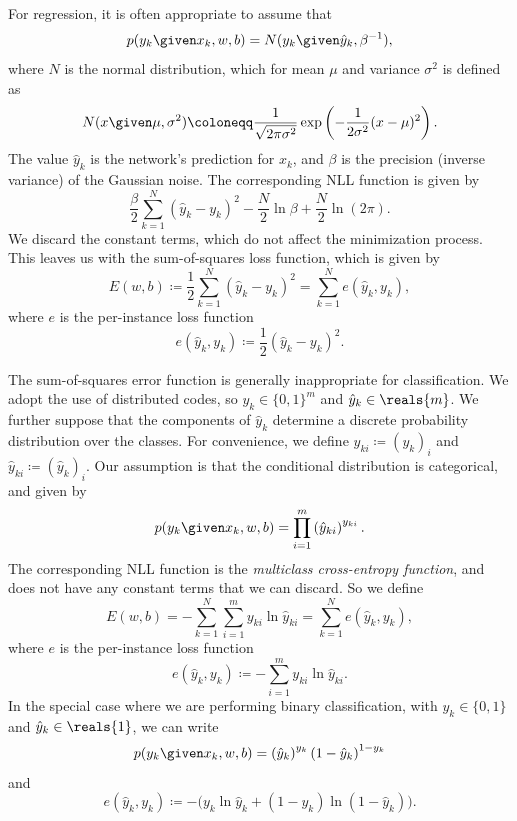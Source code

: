 \documentclass[11pt,a4paper]{article}
\numberwithin{equation}{section}
\begin{document}
For regression, it is often appropriate to assume that
\[
	p(y_k \given x_k, w, b) = N(y_k \given \hat{y}_k, \beta^{-1}),
\]
where $N$ is the normal distribution, which for mean $\mu$ and variance
$\sigma^2$ is defined as
\[
	N(x \given \mu, \sigma^2) \coloneqq \frac{1}{\sqrt{2 \pi \sigma^2}}
		\exp\left( -\frac{1}{2 \sigma^2} (x - \mu)^2 \right).
\]
The value $\hat{y}_k$ is the network's prediction for $x_k$, and $\beta$ is the
precision (inverse variance) of the Gaussian noise. The corresponding NLL
function is given by
\[
	\frac{\beta}{2} \sum_{k = 1}^N \left(\hat{y}_k - y_k\right)^2 -
		\frac{N}{2} \ln\beta + \frac{N}{2} \ln(2 \pi).
\]
We discard the constant terms, which do not affect the minimization process.
This leaves us with the sum-of-squares loss function, which is given by
\begin{equation}
	E(w, b)
	\coloneqq \frac{1}{2} \sum_{k = 1}^N \left(\hat{y}_k - y_k\right)^2
	= \sum_{k = 1}^N e(\hat{y}_k, y_k),
	\label{eq:sum_of_squares}
\end{equation}
where $e$ is the per-instance loss function
\[
	e(\hat{y}_k, y_k) \coloneqq \frac{1}{2} \left(\hat{y}_k - y_k\right)^2.
\]

The sum-of-squares error function is generally inappropriate for classification.
We adopt the use of distributed codes, so $y_k \in \{0, 1\}^m$ and $\hat{y}_k
\in \reals{m}$. We further suppose that the components of $\hat{y}_k$ determine
a discrete probability distribution over the classes. For convenience, we define
$y_{ki} \coloneqq (y_k)_i$ and $\hat{y}_{ki} \coloneqq (\hat{y}_k)_i$. Our
assumption is that the conditional distribution is categorical, and given by
\[
	p(y_k \given x_k, w, b) = \prod_{i = 1}^m \left(\hat{y}_{ki}\right)^{y_{ki}}.
\]
The corresponding NLL function is the \emph{multiclass cross-entropy function},
and does not have any constant terms that we can discard. So we define
\[
	E(w, b)
	= -\sum_{k = 1}^N \sum_{i = 1}^m y_{ki} \ln\hat{y}_{ki}
	= \sum_{k = 1}^N e(\hat{y}_k, y_k),
\]
where $e$ is the per-instance loss function
\[
	e(\hat{y}_k, y_k) \coloneqq -\sum_{i = 1}^m y_{ki} \ln\hat{y}_{ki}.
\]
In the special case where we are performing binary classification, with $y_k \in
\{0, 1\}$ and $\hat{y}_k \in \reals{1}$, we can write
\[
	p(y_k \given x_k, w, b) = \left(\hat{y}_k\right)^{y_k}
		\left(1 - \hat{y}_k\right)^{1 - y_k}
\]
and
\[
	e(\hat{y}_k, y_k) \coloneqq -\big(
		y_k \ln\hat{y}_k + (1 - y_k) \ln(1 - \hat{y}_k) \big).
\]
\end{document}
